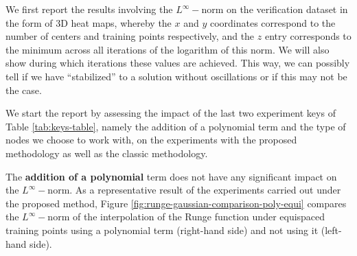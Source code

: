 \documentclass[12pt]{report} %
\begin{document}
We first report the results involving the $L^\infty-$norm on the verification dataset
in the form of 3D heat maps, whereby the $x$ and $y$ coordinates correspond to the number of centers
and training points respectively, and the $z$ entry corresponds to the minimum across all iterations
of the logarithm of this norm.
We will also show during which iterations these values are achieved. This way, we can possibly tell if
we have ``stabilized'' to a solution without oscillations or if this may not be the case.


We start the report by assessing the impact of the last two experiment keys
of Table \ref{tab:keys-table}, namely the addition of a polynomial term and
the type of nodes we choose to work with, on the experiments with the proposed methodology as well as the classic methodology.

The \textbf{addition of a polynomial} term
does not have any significant impact on the $L^{\infty} -$norm. As a representative result of the experiments carried out under the proposed method, Figure \ref{fig:runge-gaussian-comparison-poly-equi} compares the $L^{\infty} -$norm of the interpolation of the Runge function under equispaced training points using a polynomial term (right-hand side) and not using it (left-hand side).
\end{document}
